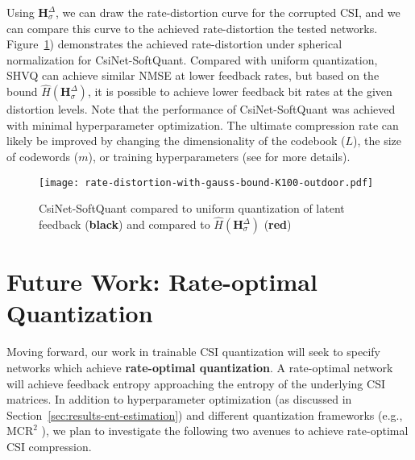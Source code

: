 Using $\mathbf H_\sigma^\Delta$, we can draw the rate-distortion curve for the corrupted CSI, and we can compare this curve to the achieved rate-distortion the tested networks. Figure~\ref{fig:csinet-soft-bound}) demonstrates the achieved rate-distortion under spherical normalization for CsiNet-SoftQuant. Compared with uniform quantization, SHVQ can achieve similar NMSE at lower feedback rates, but based on the bound $\hat H(\mathbf H_\sigma^\Delta)$, it is possible to achieve lower feedback bit rates at the given distortion levels. Note that the performance of CsiNet-SoftQuant was achieved with minimal hyperparameter optimization. The ultimate compression rate can likely be improved by changing the dimensionality of the codebook ($L$), the size of codewords ($m$), or training hyperparameters (see \cite{ref:Agustsson2017SoftToHard} for more details).  
\begin{figure}[!hbtp] \centering 
	\centering
	\texttt{[image: rate-distortion-with-gauss-bound-K100-outdoor.pdf]}
	\caption{CsiNet-SoftQuant compared to uniform quantization of latent feedback (\textbf{black}) and compared to $\hat H(\mathbf H_\sigma^\Delta)$ (\textbf{{\color{red}red}})} 
	\label{fig:csinet-soft-bound} 
\end{figure}

\section{Future Work: Rate-optimal Quantization}

Moving forward, our work in trainable CSI quantization will seek to specify networks which achieve \textbf{rate-optimal quantization}. A rate-optimal network will achieve feedback entropy approaching the entropy of the underlying CSI matrices. In addition to hyperparameter optimization (as discussed in Section~\ref{sec:results-ent-estimation}) and different quantization frameworks (e.g., $\text{MCR}^2$ \cite{ref:Yu2020MCR2}), we plan to investigate the following two avenues to achieve rate-optimal CSI compression.


